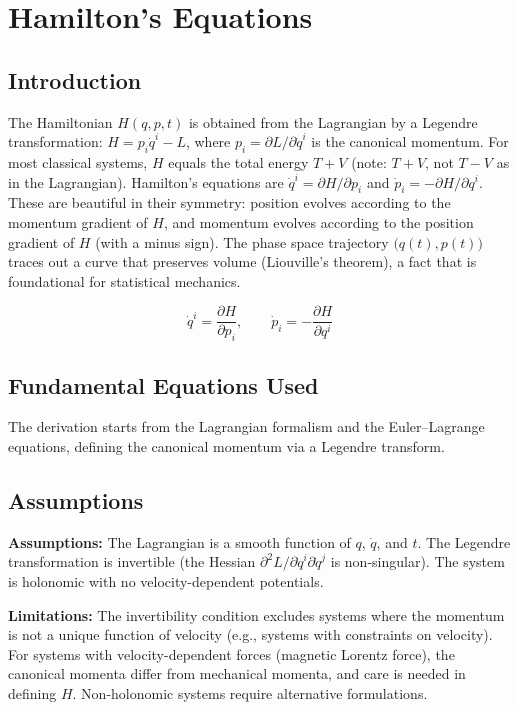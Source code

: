 \chapter{Hamilton's Equations}

\section*{Introduction}

The Hamiltonian $H(q,p,t)$ is obtained from the Lagrangian by a Legendre transformation: $H = p_i\dot{q}^i - L$, where $p_i = \partial L/\partial\dot{q}^i$ is the canonical momentum. For most classical systems, $H$ equals the total energy $T + V$ (note: $T + V$, not $T - V$ as in the Lagrangian). Hamilton's equations are $\dot{q}^i = \partial H/\partial p_i$ and $\dot{p}_i = -\partial H/\partial q^i$. These are beautiful in their symmetry: position evolves according to the momentum gradient of $H$, and momentum evolves according to the position gradient of $H$ (with a minus sign). The phase space trajectory $\bigl(q(t), p(t)\bigr)$ traces out a curve that preserves volume (Liouville's theorem), a fact that is foundational for statistical mechanics.


\[
\dot{q}^i = \frac{\partial H}{\partial p_i},\qquad \dot{p}_i = -\frac{\partial H}{\partial q^i}
\]

\section*{Fundamental Equations Used}

The derivation starts from the Lagrangian formalism and the Euler--Lagrange equations, defining the canonical momentum via a Legendre transform.

\section*{Assumptions}

\textbf{Assumptions:} The Lagrangian is a smooth function of $q$, $\dot{q}$, and $t$. The Legendre transformation is invertible (the Hessian $\partial^2 L/\partial\dot{q}^i\partial\dot{q}^j$ is non-singular). The system is holonomic with no velocity-dependent potentials.


\textbf{Limitations:} The invertibility condition excludes systems where the momentum is not a unique function of velocity (e.g., systems with constraints on velocity). For systems with velocity-dependent forces (magnetic Lorentz force), the canonical momenta differ from mechanical momenta, and care is needed in defining $H$. Non-holonomic systems require alternative formulations.


